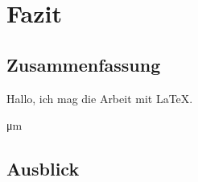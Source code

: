 \chapter{Fazit}\label{cha:fazit}
\section{Zusammenfassung}


\blindtext[1] Hallo, ich mag die Arbeit mit \LaTeX.

\si{\micro\meter}

\blindtext[1]

\blindtext[1]

\blindtext[1]

\blindtext[2]


\section{Ausblick}

\blindtext[5]
